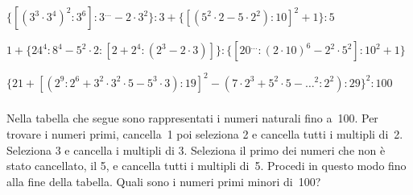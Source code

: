 \begin{esercizio} %
\(\{[(3^3\cdot3^4)^2:3^6]:3^{\dots}-2\cdot3^2\}:3+\{[(5^2\cdot2-5\cdot2^2):10]
^2+1\}:5\) 
\end{esercizio}
\begin{esercizio} %
\(1+\{24^4:8^4-5^2\cdot2:[2+2^4:(2^3-2\cdot3)]\}:\{[20^{\dots}:(2\cdot10)^6-2^
2\cdot5^2]:10^2+1\}\) 
\end{esercizio}
\begin{esercizio} %
\(\{21+[(2^9:2^6+3^2\cdot3^2\cdot5-5^3\cdot3):19]^2-
(7\cdot2^3+5^2\cdot5-{\dots}^2:2^2):29\}^2:100\) 
\end{esercizio}

\subsubsection*{}

\begin{esercizio}
\begin{htmulticols}{2}
Nella tabella che segue sono rappresentati i numeri naturali fino a~100. 
Per trovare i numeri primi, cancella~1
poi seleziona 2 e cancella tutti i multipli di~2. 
Seleziona 3 e cancella i multipli di 3. 
Seleziona il primo dei numeri che non è stato cancellato, il 5, e cancella
tutti i multipli di~5. 
Procedi in questo modo fino alla fine della tabella. 
Quali sono i numeri primi minori di~100?
\columnbreak\vfil
% 
\end{htmulticols}
\end{esercizio}

